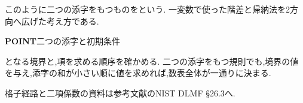このように二つの添字をもつものを\textbf{}という.
一変数で使った階差と帰納法を2方向へ広げた考え方である.

\begin{bookpoint}
  \textbf{POINT}\quad 二つの添字と初期条件\par
  となる境界と,項を求める順序を確かめる.
  二つの添字をもつ規則でも,境界の値を与え,添字の和が小さい順に値を求めれば,数表全体が一通りに決まる.
\end{bookpoint}
格子経路と二項係数の資料は参考文献のNIST DLMF §26.3へ.
